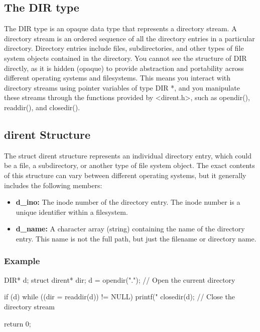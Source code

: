 \documentclass{report}
\begin{document}
    \subsection{The DIR type}
    \bigbreak \noindent 
    The DIR type is an opaque data type that represents a directory stream. A directory stream is an ordered sequence of all the directory entries in a particular directory. Directory entries include files, subdirectories, and other types of file system objects contained in the directory.
    \bigbreak \noindent 
    You cannot see the structure of DIR directly, as it is hidden (opaque) to provide abstraction and portability across different operating systems and filesystems. This means you interact with directory streams using pointer variables of type DIR *, and you manipulate these streams through the functions provided by <dirent.h>, such as opendir(), readdir(), and closedir().
    \bigbreak \noindent 
    \subsection{dirent Structure}
    \bigbreak \noindent 
    The struct dirent structure represents an individual directory entry, which could be a file, a subdirectory, or another type of file system object. The exact contents of this structure can vary between different operating systems, but it generally includes the following members:

    \begin{itemize}
        \item \textbf{d\_ino:} The inode number of the directory entry. The inode number is a unique identifier within a filesystem.
        \item \textbf{d\_name:} A character array (string) containing the name of the directory entry. This name is not the full path, but just the filename or directory name.
    \end{itemize}
    \bigbreak \noindent 
    \subsubsection{Example}
    \bigbreak \noindent 
    \begin{cppcode}
    DIR* d;
    struct dirent* dir;
    d = opendir("."); // Open the current directory
    
    if (d) {
        while ((dir = readdir(d)) != NULL) {
            printf("%
        }
        closedir(d); // Close the directory stream
    }

    return 0;

    \end{cppcode}
\end{document}
